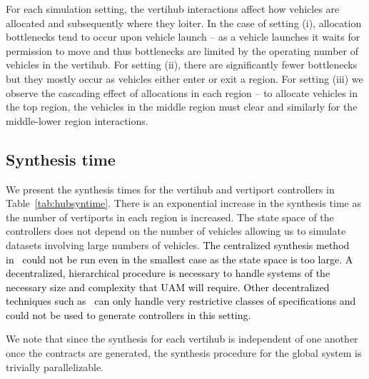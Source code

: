 For each simulation setting, the vertihub interactions affect how vehicles are allocated and subsequently where they loiter.
In the case of setting (i), allocation bottlenecks tend to occur upon vehicle launch -- as a vehicle launches it waits for permission to move and thus bottlenecks are limited by the operating number of vehicles in the vertihub.
For setting (ii), there are significantly fewer bottlenecks but they mostly occur as vehicles either enter or exit a region.
For setting (iii) we observe the cascading effect of allocations in each region -- to allocate vehicles in the top region, the vehicles in the middle region must clear and similarly for the middle-lower region interactions.

\subsection{Synthesis time}

We present the synthesis times for the vertihub and vertiport controllers in Table~\ref{tab:hubsyntime}. 
There is an exponential increase in the synthesis time as the number of vertiports in each region is increased.
The state space of the controllers does not depend on the number of vehicles allowing us to simulate datasets involving large numbers of vehicles. \textcolor{black}{
The centralized synthesis method in~\cite{bh18} could not be run even in the smallest case as the state space is too large. A decentralized, hierarchical procedure is necessary to handle systems of the necessary size and complexity that UAM will require. Other decentralized techniques such as~\cite{bhnfm} can only handle very restrictive classes of specifications and could not be used to generate controllers in this setting.}

We note that since the synthesis for each vertihub is independent of one another once the contracts are generated, the synthesis procedure for the global system is trivially parallelizable. 

